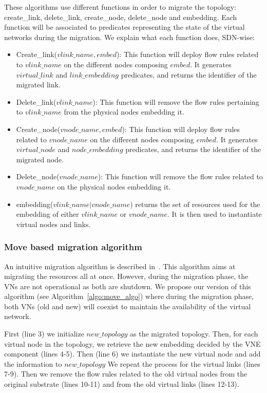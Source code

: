 These algorithms use different functions in order to migrate the topology: create\_link, delete\_link, create\_node, delete\_node and embedding. 
Each function will be associated to predicates representing the state of the virtual networks during the migration.
We explain what each function does, SDN-wise:

\begin{itemize}
\item Create\_link($vlink\_name,embed$): This function will deploy flow rules related to $vlink\_name$ on the different nodes composing $embed$. It generates $virtual\_link$ and $link\_embedding$ predicates, and returns the identifier of the migrated link.
\item Delete\_link($vlink\_name$): This function will remove the flow rules pertaining to $vlink\_name$ from the physical nodes embedding it.
\item Create\_node($vnode\_name,embed$): This function will deploy flow rules related to $vnode\_name$ on the different nodes composing $embed$. It generates $virtual\_node$ and $node\_embedding$ predicates, and returns the identifier of the migrated node.
\item Delete\_node($vnode\_name$): This function will remove the flow rules related to  $vnode\_name$ on the physical nodes embedding it.
\item embedding($vlink\_name|vnode\_name$) returns the set of resources used for the embedding of either $vlink\_name$ or $vnode\_name$. It is then used to instantiate virtual nodes and links.
\end{itemize}



\subsubsection{Move based migration algorithm}
\label{sec:move-algo}

An intuitive migration algorithm is described in~\cite{Lime-Ghorbani2014}. 
This algorithm aims at migrating the resources all at once.
However, during the migration phase, the VNs are not operational as both are shutdown.
We propose our version of this algorithm (see Algorithm~\ref{algo:move_algo}) where during the migration phase, both VNs (old and new) will coexist to maintain the availability of the virtual network.

First (line 3) we initialize $new\_topology$ as the migrated topology. Then, for each virtual node in the topology, we retrieve the new embedding decided by the VNE component (lines 4-5).
Then (line 6) we instantiate the new virtual node and add the information to $new\_topology$
We repeat the process for the virtual links (lines 7-9).
Then we remove the flow rules related to the old virtual nodes from the original substrate (lines 10-11) and from the old virtual links (lines 12-13).

